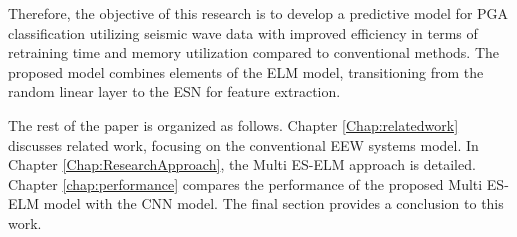 Therefore, the objective of this research is to develop a predictive model for PGA classification utilizing seismic wave data with improved efficiency in terms of retraining time and memory utilization compared to conventional methods. The proposed model combines elements of the ELM model, transitioning from the random linear layer to the ESN for feature extraction.

The rest of the paper is organized as follows. Chapter \ref{Chap:relatedwork} discusses related work, focusing on the conventional EEW systems model. In Chapter \ref{Chap:ResearchApproach}, the Multi ES-ELM approach is detailed. Chapter \ref{chap:performance} compares the performance of the proposed Multi ES-ELM model with the CNN model. The final section provides a conclusion to this work.



